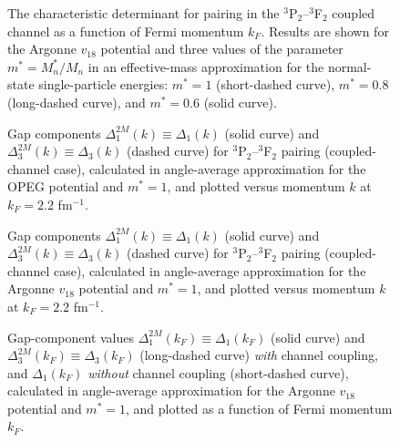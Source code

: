 \begin{figure}
\begin{center}
\end{center}
\caption{
The characteristic determinant for pairing in the $^3$P$_2$--$^3$F$_2$ 
coupled channel as a function of Fermi momentum $k_F$.  Results are
shown for the Argonne $v_{18}$ potential and three values of the parameter 
$m^*=M_n^*/M_n$ in an effective-mass approximation for the 
normal-state single-particle energies: $m^*=1$ (short-dashed curve), 
$m^*=0.8$ (long-dashed curve), and $m^*=0.6$ (solid curve).}
\label{fig:tripdet}
\end{figure}

\begin{figure}
\begin{center}
\end{center}
\caption{
Gap components $\Delta_1^{2M}(k)\equiv\Delta_1(k)$ (solid curve) and 
$\Delta_3^{2M}(k)\equiv\Delta_3(k)$ (dashed curve) for 
$^3$P$_2$--$^3$F$_2$ pairing (coupled-channel case),
calculated in angle-average approximation for the OPEG potential
and $m^*=1$, and plotted versus momentum $k$ at $k_F = 2.2$ fm$^{-1}$. 
}
\label{fig:opegcoupled}
\end{figure}

\begin{figure}
\begin{center}
\end{center}
\caption{
Gap components $\Delta_1^{2M}(k)\equiv \Delta_1(k)$ (solid curve) and 
$\Delta_3^{2M}(k)\equiv \Delta_3(k)$ (dashed curve) for $^3$P$_2$--$^3$F$_2$ 
pairing (coupled-channel case), calculated in angle-average approximation 
for the Argonne $v_{18}$ potential and $m^*=1$, and plotted versus momentum 
$k$ at $k_F = 2.2$ fm$^{-1}$. 
}
\label{fig:v18coupled}
\end{figure}

\begin{figure}
\begin{center}
\end{center}
\caption{
Gap-component values $\Delta_1^{2M}(k_F)\equiv \Delta_1(k_F)$ (solid curve) 
and $\Delta_3^{2M}(k_F)\equiv \Delta_3(k_F)$ (long-dashed curve) {\it with} 
channel coupling, and $\Delta_1(k_F)$ {\it without} channel coupling 
(short-dashed curve), calculated in angle-average approximation for the 
Argonne $v_{18}$ potential and $m^*=1$, and plotted as a function of Fermi 
momentum $k_F$.
}
\label{fig:deltav18}
\end{figure}

